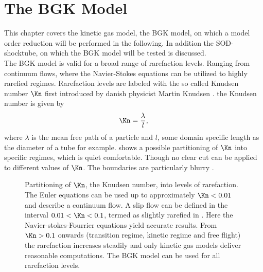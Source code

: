

\chapter{The BGK Model}
\label{Ch:BGK}




This chapter covers the kinetic gas model, the BGK model, on which a model order reduction will be performed in the following. In addition the SOD-shocktube, on which the BGK model will be tested is discussed.\\
The BGK model is valid for a broad range of rarefaction levels. Ranging from continuum flows, where the Navier-Stokes equations can be utilized to highly rarefied regimes. Rarefaction levels are labeled with the so called Knudsen number \(\Kn\) first introduced by danish physicist Martin Knudsen \cite{Bernard}. the Knudsen number is given by
\begin{equation}
	\Kn = \frac{\lambda}{l}, 
\end{equation}
where \(\lambda\) is the mean free path of a particle and \(l\), some domain specific length as the diameter of a tube for example.  shows a possible partitioning of \(\Kn\) into specific regimes, which is quiet comfortable. Though no clear cut can be applied to different values of \(\Kn\). The boundaries are particularly blurry \cite{schaaf}.
\begin{figure}[H]
	
	\caption{Partitioning of \(\Kn\), the Knudsen number, into levels of rarefaction. The Euler equations can be used up to approximately \(\Kn < 0.01\) and describe a \glqq continuum flow\grqq{}. A \grqq slip flow\grqq{} can be defined in the interval \(0.01 < \Kn < 0.1\), termed as slightly rarefied in \cite{schaaf}. Here the Navier-stokes-Fourrier equations yield accurate results. From \(\Kn > 0.1\) onwards (transition regime, kinetic regime and free flight) the rarefaction increases steadily and only kinetic gas models deliver reasonable computations. The BGK model can be used for all rarefaction levels.}
	\label{Fig:ExpKN}
\end{figure}
